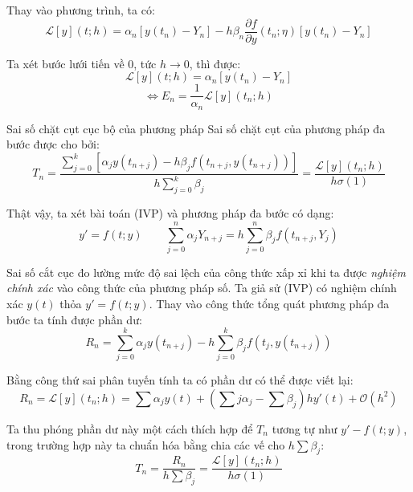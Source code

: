 Thay vào phương trình, ta có:
\[
\mathcal{L}[y](t; h) = \alpha_n \left[ y(t_n) - Y_n\right] - h\beta_n \frac{\partial f}{\partial y}(t_n;\eta)\left[y(t_n) - Y_n\right]
\]

Ta xét bước lưới tiến về $0$, tức $h \to 0$, thì được:
\[
\mathcal{L}[y](t; h) = \alpha_n \left[ y(t_n) - Y_n\right]
\]
\[
\Leftrightarrow E_n = \frac{1}{\alpha_n} \mathcal{L}[y](t_n; h)
\]

\begin{baitapbox}{Sai số chặt cụt cục bộ của phương pháp}
    Sai số chặt cụt của phương pháp đa bước được cho bởi:
    \begin{equation}
         T_n = \frac{ \sum_{j=0}^{k} \left[ \alpha_j y(t_{n+j})  -h  \beta_j f(t_{n+j}, y(t_{n+j}))\right]}{h \sum_{j=0}^{k} \beta_j} = \frac{\mathcal{L}[y](t_n; h)}{h \sigma(1)} \tag{2.9} \label{eq:2.9}
    \end{equation}
   

\end{baitapbox}


Thật vậy, ta xét bài toán (IVP) và phương pháp đa bước có dạng:
\[
y'=f(t;y) \qquad \sum_{j=0}^{n} \alpha_j Y_{n+j}  =h  \sum_{j=0}^{n}\beta_j f(t_{n+j}, Y_j)
\]

Sai số cắt cục đo lường mức độ sai lệch của công thức xấp xỉ khi ta được \textit{nghiệm chính xác} vào công thức của phương pháp số. Ta giả sử (IVP) có nghiệm chính xác $y(t)$ thỏa $y'=f(t;y)$. Thay vào công thức tổng quát phương pháp đa bước ta tính được phần dư:
\[
R_n = \sum_{j=0}^{k} \alpha_j y(t_{n+j})  -h  \sum_{j=0}^{k}\beta_j f(t_{j}, y(t_{n+j}))
\]

Bằng công thứ sai phân tuyến tính ta có phần dư có thể được viết lại:
\[
R_n = \mathcal{L}[y](t_n; h) = \sum \alpha_j y(t) + \left(\sum j\alpha_j -\sum \beta_j\right) h y'(t) + \mathcal{O}({h^2})
\]

Ta thu phóng phần dư này một cách thích hợp để $T_n$ tương tự như $y'-f(t;y)$, trong trường hợp này ta chuẩn hóa bằng chia các vế cho $h\sum\beta_j$:
\[
T_n = \frac{R_n}{h\sum \beta_j} = \frac{\mathcal{L}[y](t_n; h)}{h\sigma(1)}
\]

